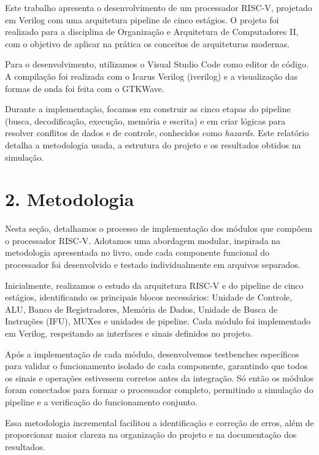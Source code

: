 \documentclass[12pt, a4paper]{article}
\begin{document}
Este trabalho apresenta o desenvolvimento de um processador RISC-V, projetado em Verilog com uma arquitetura pipeline de cinco estágios. O projeto foi realizado para a disciplina de Organização e Arquitetura de Computadores II, com o objetivo de aplicar na prática os conceitos de arquiteturas modernas.

Para o desenvolvimento, utilizamos o Visual Studio Code como editor de código. A compilação foi realizada com o Icarus Verilog (iverilog) e a visualização das formas de onda foi feita com o GTKWave.

Durante a implementação, focamos em construir as cinco etapas do pipeline (busca, decodificação, execução, memória e escrita) e em criar lógicas para resolver conflitos de dados e de controle, conhecidos como \textit{hazards}. Este relatório detalha a metodologia usada, a estrutura do projeto e os resultados obtidos na simulação.

\section*{2. Metodologia}

Nesta seção, detalhamos o processo de implementação dos módulos que compõem o processador RISC-V. Adotamos uma abordagem modular, inspirada na metodologia apresentada no livro, onde cada componente funcional do processador foi desenvolvido e testado individualmente em arquivos separados.

Inicialmente, realizamos o estudo da arquitetura RISC-V e do pipeline de cinco estágios, identificando os principais blocos necessários: Unidade de Controle, ALU, Banco de Registradores, Memória de Dados, Unidade de Busca de Instruções (IFU), MUXes e unidades de pipeline. Cada módulo foi implementado em Verilog, respeitando as interfaces e sinais definidos no projeto.

Após a implementação de cada módulo, desenvolvemos testbenches específicos para validar o funcionamento isolado de cada componente, garantindo que todos os sinais e operações estivessem corretos antes da integração. Só então os módulos foram conectados para formar o processador completo, permitindo a simulação do pipeline e a verificação do funcionamento conjunto.

Essa metodologia incremental facilitou a identificação e correção de erros, além de proporcionar maior clareza na organização do projeto e na documentação dos resultados.
\end{document}
